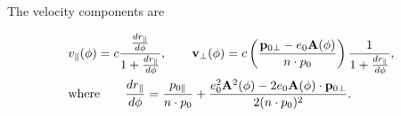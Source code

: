 The velocity components are
\begin{highlightbox}
    \begin{align}
         & v_{\parallel}(\phi)=c\frac{\frac{dr_{\parallel}}{d\phi}}{1+\frac{dr_{\parallel}}{d\phi}},\qquad
         {\bf v}_{\perp}(\phi)=c\left(\frac{{\bf p}_{0\perp}-e_0{\bf A}(\phi)}{n\cdot p_0}\right)
         \frac{1}{1+\frac{dr_{\parallel}}{d\phi}}, \\
         & \text{where}\qquad
         \frac{dr_{\parallel}}{d\phi}=\frac{p_{0\parallel}}{n\cdot p_0}
         +\frac{e_0^2{\bf A}^2(\phi)-2e_0{\bf A}(\phi)\cdot{\bf p}_{0\perp}}{2(n\cdot p_0)^2}.
    \end{align}
\end{highlightbox}
